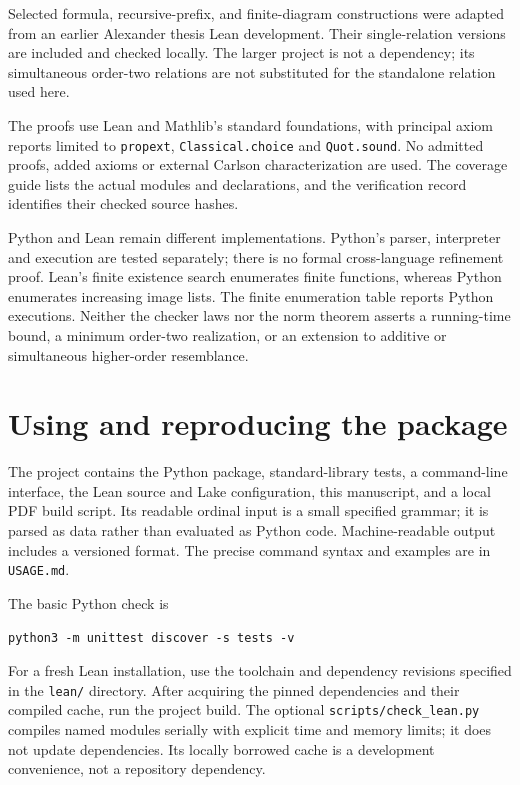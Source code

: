 \documentclass[11pt]{article}
\begin{document}
Selected formula, recursive-prefix, and finite-diagram constructions were
adapted from an earlier Alexander thesis Lean development. Their
single-relation versions are included and checked locally. The larger
project is not a dependency; its simultaneous order-two relations are
not substituted for the standalone relation used here.

The proofs use Lean and Mathlib's standard foundations, with principal
axiom reports limited to \texttt{propext}, \texttt{Classical.choice}
and \texttt{Quot.sound}. No admitted proofs, added axioms or external
Carlson characterization are used. The coverage guide lists the actual
modules and declarations, and the verification record identifies their
checked source hashes.

Python and Lean remain different implementations. Python's parser,
interpreter and execution are tested separately; there is no formal
cross-language refinement proof. Lean's finite existence search enumerates
finite functions, whereas Python enumerates increasing image lists.
The finite enumeration table reports Python executions. Neither the
checker laws nor the norm theorem asserts a running-time bound, a minimum
order-two realization, or an extension to additive or simultaneous
higher-order resemblance.

\section{Using and reproducing the package}

The project contains the Python package, standard-library tests, a
command-line interface, the Lean source and Lake configuration, this
manuscript, and a local PDF build script. Its readable ordinal input is
a small specified grammar; it is parsed as data rather than evaluated
as Python code. Machine-readable output includes a versioned format.
The precise command syntax and examples are in \texttt{USAGE.md}.

The basic Python check is
\begin{verbatim}
python3 -m unittest discover -s tests -v
\end{verbatim}
For a fresh Lean installation, use the toolchain and dependency revisions
specified in the \texttt{lean/} directory. After acquiring the pinned
dependencies and their compiled cache, run the project build. The
optional \texttt{scripts/check\_lean.py} compiles named modules serially
with explicit time and memory limits; it does not update dependencies.
Its locally borrowed cache is a development convenience, not a
repository dependency.
\end{document}
